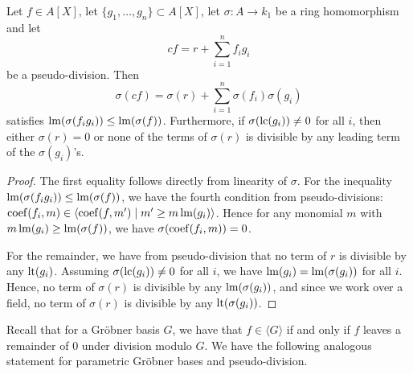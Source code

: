 \begin{lemma}\label{lem:ps_div_to_div}
  Let $f \in A[X]$, let $\{g_{1}, \dots, g_{n}\} \subset A[X]$, let $\sigma : A \to k_{1}$ be a ring homomorphism and let
  \[cf = r + \sum_{i=1}^{n}f_{i}g_{i}\]
  be a pseudo-division. Then
  \[\sigma(cf) = \sigma(r) + \sum_{i=1}^{n} \sigma(f_{i})\sigma(g_{i})\]
  satisfies $\operatorname{lm}(\sigma(f_{i} g_{i})) \leq \operatorname{lm}(\sigma(f))$. Furthermore, if $\sigma(\operatorname{lc}(g_{i})) \neq 0$ for all $i$, then either $\sigma(r) = 0$ or none of the terms of $\sigma(r)$ is divisible by any leading term of the $\sigma(g_{i})$'s.
\end{lemma}
\begin{proof}
  The first equality follows directly from linearity of $\sigma$. For the inequality $\operatorname{lm}(\sigma(f_{i} g_{i})) \leq \operatorname{lm}(\sigma(f))$, we have the fourth condition from pseudo-divisions: $\operatorname{coef}(f_{i}, m) \in \langle \operatorname{coef}(f, m') \mid m' \geq m \operatorname{lm}(g_{i}) \rangle$. Hence for any monomial $m$ with $m\operatorname{lm}(g_{i}) \geq \operatorname{lm}(\sigma(f))$, we have $\sigma(\operatorname{coef}(f_{i}, m)) = 0$.

  For the remainder, we have from pseudo-division that no term of $r$ is divisible by any $\operatorname{lt}(g_{i})$. Assuming $\sigma(\operatorname{lc}(g_{i})) \neq 0$ for all $i$, we have $\operatorname{lm}(g_{i}) = \operatorname{lm}(\sigma(g_{i}))$ for all $i$. Hence, no term of $\sigma(r)$ is divisible by any $\operatorname{lm}(\sigma(g_{i}))$, and since we work over a field, no term of $\sigma(r)$ is divisible by any $\operatorname{lt}(\sigma(g_{i}))$.
\end{proof}

Recall that for a Gröbner basis $G$, we have that $f \in \langle G \rangle$ if and only if $f$ leaves a remainder of $0$ under division modulo $G$. We have the following analogous statement for parametric Gröbner bases and pseudo-division.

